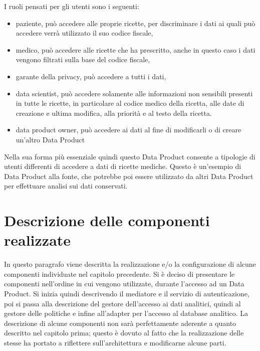 \documentclass[12pt]{report}
\begin{document}
I ruoli pensati per gli utenti sono i seguenti:
\begin{itemize}
    \item paziente, può accedere alle proprie ricette, per discriminare i dati ai quali può accedere verrà utilizzato il suo codice fiscale,
    \item medico, può accedere alle ricette che ha prescritto, anche in questo caso i dati vengono filtrati sulla base del codice fiscale,
    \item garante della privacy, può accedere a tutti i dati,
    \item data scientist, può accedere solamente alle informazioni non sensibili presenti in tutte le ricette, in particolare al codice medico della ricetta, alle date  di creazione e ultima modifica, alla priorità e al testo della ricetta.  
    \item data product owner, può accedere ai dati al fine di modificarli o di creare un'altro Data Product
\end{itemize}
Nella sua forma più essenziale quindi questo Data Product consente a tipologie di utenti differenti di accedere a dati di ricette mediche.
Questo è un'esempio di Data Product alla fonte, che potrebbe poi essere utilizzato da altri Data Product per effettuare analisi sui dati conservati.

\section{Descrizione delle componenti realizzate}
In questo paragrafo viene descritta la realizzazione e/o la configurazione di alcune componenti individuate nel capitolo precedente.
Si è deciso di presentare le componenti nell'ordine in cui vengono utilizzate, durante l'accesso ad un Data Product.
Si inizia quindi descrivendo il mediatore e il servizio di autenticazione, poi si passa alla descrizione del gestore dell'accesso ai dati analitici, quindi al gestore delle politiche e infine all'adapter per l'accesso al database analitico.
La descrizione di alcune componenti non sarà perfettamente aderente a quanto descritto nel capitolo prima; questo è dovuto al fatto che la realizzazione delle stesse ha portato a riflettere sull'architettura e modificarne alcune parti.
\end{document}
